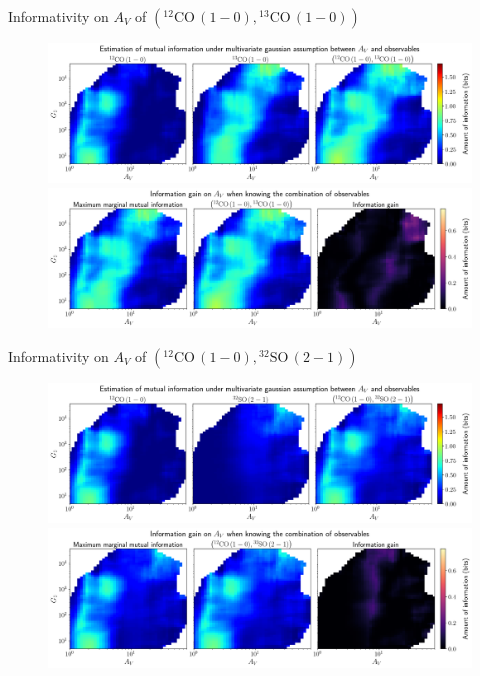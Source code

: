 \documentclass{beamer}
\begin{document}
\begin{frame}{Informativity on $A_V$ of $\left(\mathrm{^{12}CO\,(1-0)},\mathrm{^{13}CO\,(1-0)}\right)$}
    \begin{figure}
        \centering
        \includegraphics[width=0.95\linewidth]{../linearinfogauss/av__12co10_13co10_linearinfogauss.png}
        \vfill
        \includegraphics[width=0.95\linewidth]{../linearinfogauss/av__12co10_13co10_linearinfogauss_gain.png}
    \end{figure}
\end{frame}

\begin{frame}{Informativity on $A_V$ of $\left(\mathrm{^{12}CO\,(1-0)},\mathrm{^{32}SO\,(2-1)}\right)$}
    \begin{figure}
        \centering
        \includegraphics[width=0.95\linewidth]{../linearinfogauss/av__12co10_32so21_linearinfogauss.png}
        \vfill
        \includegraphics[width=0.95\linewidth]{../linearinfogauss/av__12co10_32so21_linearinfogauss_gain.png}
    \end{figure}
\end{frame}
\end{document}
